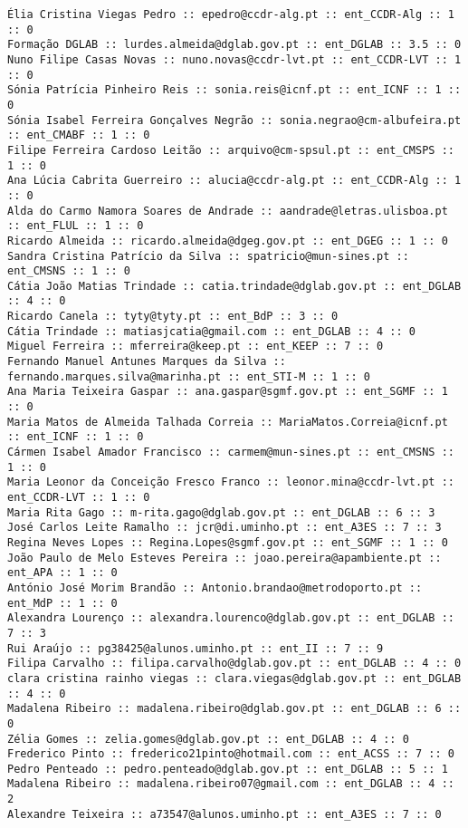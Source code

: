 \documentclass[11pt,a4paper]{report}%
\begin{document}
\begin{verbatim}
Élia Cristina Viegas Pedro :: epedro@ccdr-alg.pt :: ent_CCDR-Alg :: 1 :: 0
Formação DGLAB :: lurdes.almeida@dglab.gov.pt :: ent_DGLAB :: 3.5 :: 0
Nuno Filipe Casas Novas :: nuno.novas@ccdr-lvt.pt :: ent_CCDR-LVT :: 1 :: 0
Sónia Patrícia Pinheiro Reis :: sonia.reis@icnf.pt :: ent_ICNF :: 1 :: 0
Sónia Isabel Ferreira Gonçalves Negrão :: sonia.negrao@cm-albufeira.pt :: ent_CMABF :: 1 :: 0
Filipe Ferreira Cardoso Leitão :: arquivo@cm-spsul.pt :: ent_CMSPS :: 1 :: 0
Ana Lúcia Cabrita Guerreiro :: alucia@ccdr-alg.pt :: ent_CCDR-Alg :: 1 :: 0
Alda do Carmo Namora Soares de Andrade :: aandrade@letras.ulisboa.pt :: ent_FLUL :: 1 :: 0
Ricardo Almeida :: ricardo.almeida@dgeg.gov.pt :: ent_DGEG :: 1 :: 0
Sandra Cristina Patrício da Silva :: spatricio@mun-sines.pt :: ent_CMSNS :: 1 :: 0
Cátia João Matias Trindade :: catia.trindade@dglab.gov.pt :: ent_DGLAB :: 4 :: 0
Ricardo Canela :: tyty@tyty.pt :: ent_BdP :: 3 :: 0
Cátia Trindade :: matiasjcatia@gmail.com :: ent_DGLAB :: 4 :: 0
Miguel Ferreira :: mferreira@keep.pt :: ent_KEEP :: 7 :: 0
Fernando Manuel Antunes Marques da Silva :: fernando.marques.silva@marinha.pt :: ent_STI-M :: 1 :: 0
Ana Maria Teixeira Gaspar :: ana.gaspar@sgmf.gov.pt :: ent_SGMF :: 1 :: 0
Maria Matos de Almeida Talhada Correia :: MariaMatos.Correia@icnf.pt :: ent_ICNF :: 1 :: 0
Cármen Isabel Amador Francisco :: carmem@mun-sines.pt :: ent_CMSNS :: 1 :: 0
Maria Leonor da Conceição Fresco Franco :: leonor.mina@ccdr-lvt.pt :: ent_CCDR-LVT :: 1 :: 0
Maria Rita Gago :: m-rita.gago@dglab.gov.pt :: ent_DGLAB :: 6 :: 3
José Carlos Leite Ramalho :: jcr@di.uminho.pt :: ent_A3ES :: 7 :: 3
Regina Neves Lopes :: Regina.Lopes@sgmf.gov.pt :: ent_SGMF :: 1 :: 0
João Paulo de Melo Esteves Pereira :: joao.pereira@apambiente.pt :: ent_APA :: 1 :: 0
António José Morim Brandão :: Antonio.brandao@metrodoporto.pt :: ent_MdP :: 1 :: 0
Alexandra Lourenço :: alexandra.lourenco@dglab.gov.pt :: ent_DGLAB :: 7 :: 3
Rui Araújo :: pg38425@alunos.uminho.pt :: ent_II :: 7 :: 9
Filipa Carvalho :: filipa.carvalho@dglab.gov.pt :: ent_DGLAB :: 4 :: 0
clara cristina rainho viegas :: clara.viegas@dglab.gov.pt :: ent_DGLAB :: 4 :: 0
Madalena Ribeiro :: madalena.ribeiro@dglab.gov.pt :: ent_DGLAB :: 6 :: 0
Zélia Gomes :: zelia.gomes@dglab.gov.pt :: ent_DGLAB :: 4 :: 0
Frederico Pinto :: frederico21pinto@hotmail.com :: ent_ACSS :: 7 :: 0
Pedro Penteado :: pedro.penteado@dglab.gov.pt :: ent_DGLAB :: 5 :: 1
Madalena Ribeiro :: madalena.ribeiro07@gmail.com :: ent_DGLAB :: 4 :: 2
Alexandre Teixeira :: a73547@alunos.uminho.pt :: ent_A3ES :: 7 :: 0

\end{verbatim}
\end{document}
